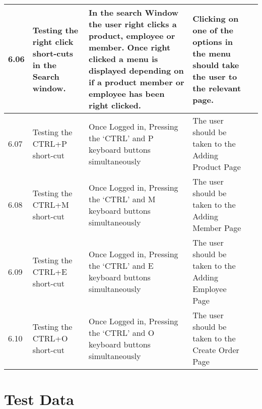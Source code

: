 \begin{flushleft}
\begin{longtable}{|p{1cm}|p{2.5cm}|p{2.5cm}|p{2cm}|p{2cm}|}
	\rowcolor{light-grey} 6.06 & Testing the right click short-cuts in the Search window. & In the search Window the user right clicks a product, employee or member. Once right clicked a menu is displayed depending on if a product member or employee has been right clicked. & Clicking on one of the options in the menu should take the user to the relevant page.& \\ \hline
	\rowcolor{light-grey} 6.07 & Testing the CTRL+P short-cut & Once Logged in, Pressing the `CTRL' and P keyboard buttons simultaneously & The user should be taken to the Adding Product Page& \\ \hline
	\rowcolor{light-grey} 6.08 & Testing the CTRL+M short-cut & Once Logged in, Pressing the `CTRL' and M keyboard buttons simultaneously & The user should be taken to the Adding Member Page& \\ \hline
	\rowcolor{light-grey} 6.09 & Testing the CTRL+E short-cut & Once Logged in, Pressing the `CTRL' and E keyboard buttons simultaneously & The user should be taken to the Adding Employee Page& \\ \hline
	\rowcolor{light-grey} 6.10 & Testing the CTRL+O short-cut & Once Logged in, Pressing the `CTRL' and O keyboard buttons simultaneously & The user should be taken to the Create Order Page& \\ \hline
\end{longtable}
\end{flushleft}

\pagebreak

\section{Test Data}


